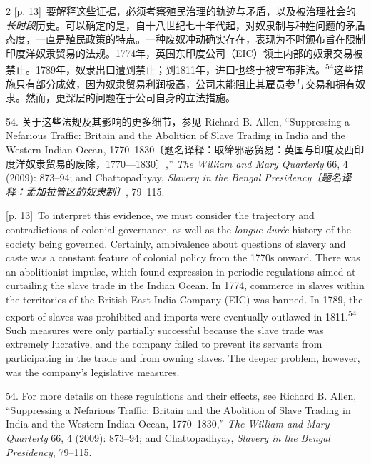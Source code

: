 \documentclass[10pt,a4paper]{article}
\begin{document}
\begin{paracol}{2}
{\scriptsize\color{gray} [p. 13]}\ 要解释这些证据，必须考察殖民治理的轨迹与矛盾，以及被治理社会的\textit{长时段}历史。可以确定的是，自十八世纪七十年代起，对奴隶制与种姓问题的矛盾态度，一直是殖民政策的特点。一种废奴冲动确实存在，表现为不时颁布旨在限制印度洋奴隶贸易的法规。1774年，英国东印度公司（EIC）领土内部的奴隶交易被禁止。1789年，奴隶出口遭到禁止；到1811年，进口也终于被宣布非\mbox{法。\textsuperscript{54}}这些措施只有部分成效，因为奴隶贸易利润极高，公司未能阻止其雇员参与交易和拥有奴隶。然而，更深层的问题在于公司自身的立法措施。\par{\small 54. 关于这些法规及其影响的更多细节，参见 Richard B. Allen, “Suppressing a Nefarious Traffic: Britain and the Abolition of Slave Trading in India and the Western Indian Ocean, 1770–1830〔题名译释：取缔邪恶贸易：英国与印度及西印度洋奴隶贸易的废除，1770—1830〕,” \textit{The William and Mary Quarterly} 66, 4 (2009): 873–94; and Chattopadhyay, \textit{Slavery in the Bengal Presidency〔题名译释：孟加拉管区的奴隶制〕}, 79–115.\par}
\switchcolumn
{\scriptsize\color{gray} [p. 13]}\ To interpret this evidence, we must consider the trajectory and contradictions of colonial governance, as well as the \textit{longue durée} history of the society being governed. Certainly, ambivalence about questions of slavery and caste was a constant feature of colonial policy from the 1770s onward. There was an abolitionist impulse, which found expression in periodic regulations aimed at curtailing the slave trade in the Indian Ocean. In 1774, commerce in slaves within the territories of the British East India Company (EIC) was banned. In 1789, the export of slaves was prohibited and imports were eventually outlawed in 1811.\nobreak\textsuperscript{54} Such measures were only partially successful because the slave trade was extremely lucrative, and the company failed to prevent its servants from participating in the trade and from owning slaves. The deeper problem, however, was the company’s legislative measures.\par{\small 54. For more details on these regulations and their effects, see Richard B. Allen, “Suppressing a Nefarious Traffic: Britain and the Abolition of Slave Trading in India and the Western Indian Ocean, 1770–1830,” \textit{The William and Mary Quarterly} 66, 4 (2009): 873–94; and Chattopadhyay, \textit{Slavery in the Bengal Presidency}, 79–115.\par}
\switchcolumn*

\end{paracol}
\end{document}

